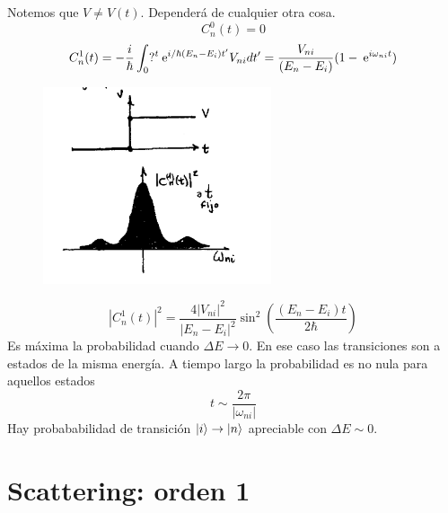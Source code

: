 \documentclass[10pt,oneside]{CBFT_book}
\begin{document}
Notemos que $V\neq V(t)$. Dependerá de cualquier otra cosa.
\[
	C^0_n(t) = 0
\]
\[
	C^1_n(t) = -\frac{i}{\hbar} \int_0?^t \:\mathrm{e}^{i/\hbar(E_n - E_i)t'} V_{ni} dt'=
	\frac{V_{ni}}{(E_n - E_i)}(1-\:\mathrm{e}^{i\omega_{ni}t})
\]
\begin{figure}[htb]
	\begin{center}
	\includegraphics[width=0.6\textwidth]{images/teo2_22.pdf}
	\end{center}
	\caption{}
\end{figure} 
\[
	|C^1_n(t)|^2 = \frac{4|V_{ni}|^2}{| E_n - E_i|^2}\sin^2\left(\frac{(E_n - E_i)t}{2\hbar}\right) 
\]
Es máxima la probabilidad cuando $\Delta E\to 0$. En ese caso las transiciones son a estados de la misma 
energía. A tiempo largo la probabilidad es no nula para aquellos estados 
\[
	t \sim \frac{2\pi}{|\omega_{ni}|}
\]
Hay probababilidad de transición $\Ket{i} \to \Ket{n}$ apreciable con $\Delta E \sim 0$.

\section{Scattering: orden 1}
\end{document}
